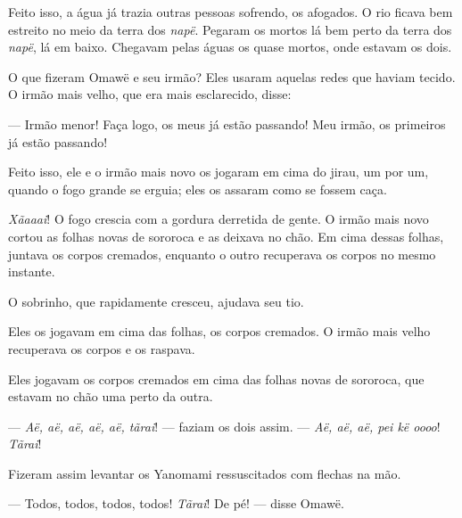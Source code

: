 Feito isso, a água já trazia outras pessoas sofrendo, os afogados. O rio ficava bem estreito no meio da terra dos \textit{napë}. Pegaram os
mortos lá bem perto da terra dos \textit{napë}, lá em baixo. Chegavam
pelas águas os quase mortos, onde estavam os dois. 

O que fizeram Omawë e seu irmão? Eles usaram aquelas redes que haviam
 tecido. O irmão mais velho, que era mais esclarecido, disse: 

--- Irmão menor! Faça logo, os meus já estão passando! Meu irmão, os
primeiros já estão passando! 


Feito isso, ele e o irmão mais novo os jogaram em cima do jirau, um por
um, quando o fogo grande se erguia; eles os assaram como se fossem
caça. 

\textit{Xãaaai}! O fogo crescia com a gordura derretida de gente. O irmão
mais novo cortou as folhas novas de sororoca e as deixava no chão. Em
cima dessas folhas, juntava os corpos cremados, enquanto o outro
recuperava os corpos no mesmo instante. 

O sobrinho, que rapidamente cresceu, ajudava seu tio. 

Eles os jogavam em cima das folhas, os corpos cremados. O irmão mais
velho recuperava os corpos e os raspava. 


Eles jogavam os corpos cremados em cima das folhas novas de sororoca,
que estavam no chão uma perto da outra. 


--- \textit{Aë, aë, aë, aë, aë, tãrai}! --- faziam os dois assim. --- \textit{Aë, aë, aë,
pei kë oooo}! \textit{Tãrai}! 

Fizeram assim levantar os Yanomami ressuscitados com flechas na mão. 

--- Todos, todos, todos, todos! \textit{Tãrai}! De pé! --- disse Omawë.

